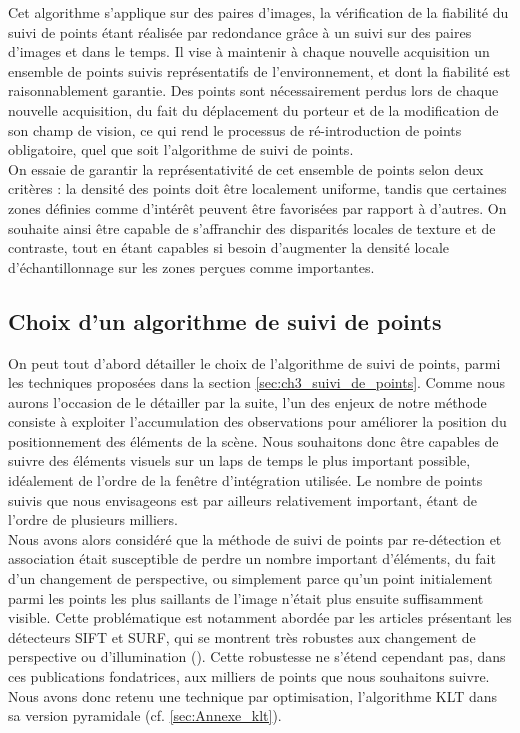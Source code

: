 Cet algorithme s'applique sur des paires d'images, la vérification de la fiabilité du suivi de points étant réalisée par redondance grâce à un suivi sur des paires d'images et dans le temps. Il vise à maintenir à chaque nouvelle acquisition un ensemble de points suivis représentatifs de l'environnement, et dont la fiabilité est raisonnablement garantie. Des points sont nécessairement perdus lors de chaque nouvelle acquisition, du fait du déplacement du porteur et de la modification de son champ de vision, ce qui rend le processus de ré-introduction de points obligatoire, quel que soit l'algorithme de suivi de points. \\
On essaie de garantir la représentativité de cet ensemble de points selon deux critères : la densité des points doit être localement uniforme, tandis que certaines zones définies comme d'intérêt peuvent être favorisées par rapport à d'autres. On souhaite ainsi être capable de s'affranchir des disparités locales de texture et de contraste, tout en étant capables si besoin d'augmenter la densité locale d'échantillonnage sur les zones perçues comme importantes. 

\subsection{Choix d'un algorithme de suivi de points}
On peut tout d'abord détailler le choix de l'algorithme de suivi de points, parmi les techniques proposées dans la section \ref{sec:ch3_suivi_de_points}.  Comme nous aurons l'occasion de le détailler par la suite, l'un des enjeux de notre méthode consiste à exploiter l'accumulation des observations pour améliorer la position du positionnement des éléments de la scène. Nous souhaitons donc être capables de suivre des éléments visuels sur un laps de temps le plus important possible, idéalement de l'ordre de la fenêtre d'intégration utilisée. Le nombre de points suivis que nous envisageons est par ailleurs relativement important, étant de l'ordre de plusieurs milliers.\\
Nous avons alors considéré que la méthode de suivi de points par re-détection et association était susceptible de perdre un nombre important d'éléments, du fait d'un changement de perspective, ou simplement parce qu'un point initialement parmi les points les plus saillants de l'image n'était plus ensuite suffisamment visible. Cette problématique est notamment abordée par les articles présentant les détecteurs SIFT et SURF, qui se montrent très robustes aux changement de perspective ou d'illumination (\cite{Lowe1999a,Bay}). Cette robustesse ne s'étend cependant pas, dans ces publications fondatrices, aux milliers de points que nous souhaitons suivre. Nous avons donc retenu une technique par optimisation, l'algorithme KLT dans sa version pyramidale (cf. \ref{sec:Annexe_klt}).

